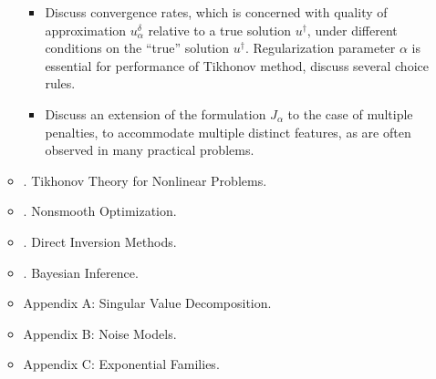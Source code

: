 \documentclass{article}
\begin{document}
\begin{itemize}
\begin{itemize}
\begin{itemize}
			\item Discuss convergence rates, which is concerned with quality of approximation $u_\alpha^\delta$ relative to a true solution $u^\dagger$, under different conditions on the ``true'' solution $u^\dagger$. Regularization parameter $\alpha$ is essential for performance of Tikhonov method, discuss several choice rules.
			\item Discuss an extension of the formulation $J_\alpha$ to the case of multiple penalties, to accommodate multiple distinct features, as are often observed in many practical problems.
		\end{itemize}		
		
		\item {. Tikhonov Theory for Nonlinear Problems.}
		\item {. Nonsmooth Optimization.}
		\item {. Direct Inversion Methods.}
		\item {. Bayesian Inference.}
		\item {\sf Appendix A: Singular Value Decomposition.}
		\item {\sf Appendix B: Noise Models.}
		\item {\sf Appendix C: Exponential Families.}
	\end{itemize}
\end{itemize}

\end{document}
